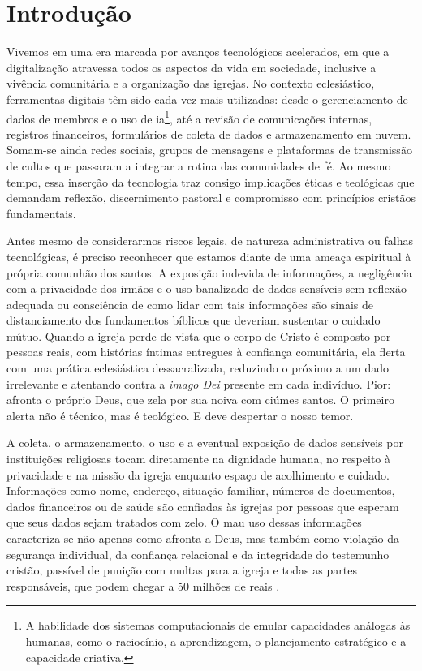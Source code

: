 \newcommand{\tituloIntroducao}{Introdução}

\chapter*{\tituloIntroducao}
\markboth{\tituloIntroducao}{\tituloIntroducao}
\addcontentsline{toc}{section}{\MakeUppercase{\tituloIntroducao}}

Vivemos em uma era marcada por avanços tecnológicos acelerados, em que a digitalização atravessa todos os aspectos da vida em sociedade, inclusive a vivência comunitária e a organização das igrejas. No contexto eclesiástico, ferramentas digitais têm sido cada vez mais utilizadas: desde o gerenciamento de dados de membros e o uso de \gls{ia}\footnote{A habilidade dos sistemas computacionais de emular capacidades análogas às humanas, como o raciocínio, a aprendizagem, o planejamento estratégico e a capacidade criativa.}, até a revisão de comunicações internas, registros financeiros, formulários de coleta de dados e armazenamento em nuvem. Somam-se ainda redes sociais, grupos de mensagens e plataformas de transmissão de cultos que passaram a integrar a rotina das comunidades de fé. Ao mesmo tempo, essa inserção da tecnologia traz consigo implicações éticas e teológicas que demandam reflexão, discernimento pastoral e compromisso com princípios cristãos fundamentais.

Antes mesmo de considerarmos riscos legais, de natureza administrativa ou falhas tecnológicas, é preciso reconhecer que estamos diante de uma ameaça espiritual à própria comunhão dos santos. A exposição indevida de informações, a negligência com a privacidade dos irmãos e o uso banalizado de dados sensíveis sem reflexão adequada  ou consciência de como lidar com tais informações são sinais de distanciamento dos fundamentos bíblicos que deveriam sustentar o cuidado mútuo. Quando a igreja perde de vista que o corpo de Cristo é composto por pessoas reais, com histórias íntimas entregues à confiança comunitária, ela flerta com uma prática eclesiástica dessacralizada, reduzindo o próximo a um dado irrelevante e atentando contra a \textit{imago Dei} presente em cada indivíduo. Pior: afronta o próprio Deus, que zela por sua noiva com ciúmes santos. O primeiro alerta não é técnico, mas é teológico. E deve despertar o nosso temor.

A coleta, o armazenamento, o uso e a eventual exposição de dados sensíveis por instituições religiosas tocam diretamente na dignidade humana, no respeito à privacidade e na missão da igreja enquanto espaço de acolhimento e cuidado. Informações como nome, endereço, situação familiar, números de documentos, dados financeiros ou de saúde são confiadas às igrejas por pessoas que esperam que seus dados sejam tratados com zelo. O mau uso dessas informações caracteriza-se não apenas como afronta a Deus, mas também como violação da segurança individual, da confiança relacional e da integridade do testemunho cristão, passível de punição com multas para a igreja e todas as partes responsáveis, que podem chegar a 50 milhões de reais \cite[art.~52, II]{lgpd2018}. 

